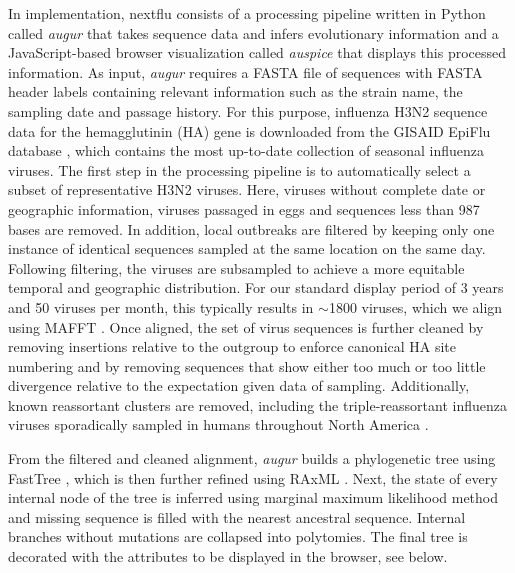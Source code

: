 \documentclass{bioinfo}
\begin{document}
In implementation, nextflu consists of a processing pipeline written in Python called \textit{augur} that takes sequence data and infers evolutionary information and a JavaScript-based browser visualization called \textit{auspice} that displays this processed information.
As input, \textit{augur} requires a FASTA file of sequences with FASTA header labels containing relevant information such as the strain name, the sampling date and passage history.
For this purpose, influenza H3N2 sequence data for the hemagglutinin (HA) gene is downloaded from the GISAID EpiFlu database \citep{GISAID}, which contains the most up-to-date collection of seasonal influenza viruses.
The first step in the processing pipeline is to automatically select a subset of representative H3N2 viruses.
Here, viruses without complete date or geographic information, viruses passaged in eggs and sequences less than 987 bases are removed.
In addition, local outbreaks are filtered by keeping only one instance of identical sequences sampled at the same location on the same day.
Following filtering, the viruses are subsampled to achieve a more equitable temporal and geographic distribution.
For our standard display period of 3 years and 50 viruses per month, this typically results in $\sim$1800 viruses, which we align using MAFFT \citep{katoh_mafft_2013}.
Once aligned, the set of virus sequences is further cleaned by removing insertions relative to the outgroup to enforce canonical HA site numbering and by removing sequences that show either too much or too little divergence relative to the expectation given data of sampling.
Additionally, known reassortant clusters are removed, including the triple-reassortant influenza viruses sporadically sampled in humans throughout North America \citep{bastien_human_2010}.

From the filtered and cleaned alignment, \textit{augur} builds a phylogenetic tree using FastTree \citep{price_fasttree_2009}, which is then further refined using RAxML \citep{stamatakis_raxml_2014}.
Next, the state of every internal node of the tree is inferred using marginal maximum likelihood method and missing sequence is filled with the nearest ancestral sequence.
Internal branches without mutations are collapsed into polytomies.
The final tree is decorated with the attributes to be displayed in the browser, see below.  
\end{document}
